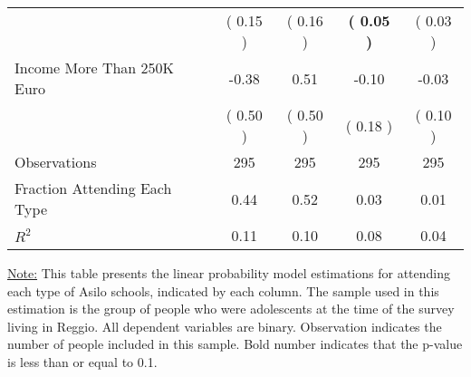 \begin{table}[H]
{\begin{tabular}{lcccc}
\quad  & (     0.15 ) & (     0.16 )  & \textbf{(     0.05 )}  & (     0.03 )  \\
\quad Income More Than 250K Euro &     -0.38 &      0.51 &     -0.10 &     -0.03 \\
\quad  & (     0.50 ) & (     0.50 )  & (     0.18 )  & (     0.10 )  \\
\midrule
Observations & 295 & 295 & 295 & 295 \\
Fraction Attending Each Type &      0.44 &      0.52 &      0.03 &      0.01 \\
\midrule
$ R^2$ &      0.11 &      0.10 &      0.08 &      0.04 \\
\bottomrule
\end{tabular}}
\end{table}
\begin{footnotesize}
\noindent\underline{Note:} This table presents the linear probability model estimations for attending each type of Asilo schools, indicated by each column. The sample used in this estimation is the group of people who were adolescents at the time of the survey living in Reggio. All dependent variables are binary. Observation indicates the number of people included in this sample. Bold number indicates that the p-value is less than or equal to 0.1.
\end{footnotesize}
